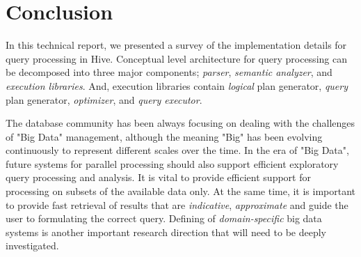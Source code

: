 \documentclass[twocolumn]{article}
\begin{document}
\section{Conclusion}
In this technical report, we presented a survey of the implementation details for query processing in Hive. Conceptual level architecture for query processing can be decomposed into three major components; \textit{parser}, \textit{semantic analyzer}, and \textit{execution libraries}. And, execution libraries contain \textit{logical} plan generator, \textit{query} plan generator, \textit{optimizer}, and \textit{query executor}.


The database community has been always focusing on dealing with the challenges of "Big Data" management, although the meaning "Big" has been evolving continuously to represent different scales over the time. 
In the era of "Big Data", future systems for parallel processing should also support efficient exploratory query processing and analysis. It is vital to provide efficient support for processing on subsets of the available data only. At the same time, it is important to provide fast retrieval of results that are \textit{indicative}, \textit{approximate} and guide the user to formulating the correct query.
Defining of \textit{domain-specific} big data systems is another important research direction that will need to be deeply investigated.



\end{document}

